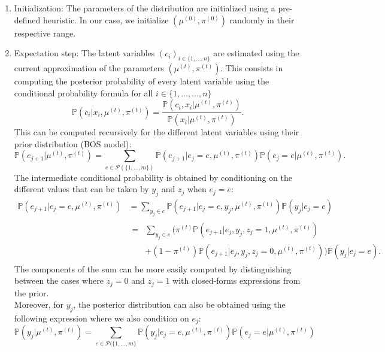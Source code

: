 \begin{enumerate}
    \item Initialization: The parameters of the distribution are initialized using a pre-defined heuristic. In our case, we initialize $(\mu^{(0)}, \pi^{(0)})$ randomly in their respective range.
    \item Expectation step: The latent variables $(c_i)_{i \in \{1, \ldots, n\}}$ are estimated using the current approximation of the parameters $(\mu^{(t)}, \pi^{(t)})$. This consists in computing the posterior probability of every latent variable using the conditional probability formula for all $i\in \{1, \ldots, ..., n\}$
    \begin{equation}
        \mathbb{P}(c_i | x_i, \mu^{(t)}, \pi^{(t)}) = \frac{\mathbb{P}(c_i, x_i| \mu^{(t)}, \pi^{(t)})}{\mathbb{P}(x_i| \mu^{(t)}, \pi^{(t)})}
    .\end{equation}
    This can be computed recursively for the different latent variables using their prior distribution (BOS model):
    \begin{equation}
        \mathbb{P}(e_{j+1}| \mu^{(t)}, \pi^{(t)}) = \sum_{e\in \mathcal{P}(\{1, \ldots, m\})} \mathbb{P}(e_{j+1}|e_j=e,  \mu^{(t)}, \pi^{(t)}) \mathbb{P}(e_j=e| \mu^{(t)}, \pi^{(t)})
    .\end{equation}
    The intermediate conditional probability is obtained by conditioning on the different values that can be taken by $y_j$ and $z_j$ when $e_j=e$:
    \begin{align}
    \mathbb{P}(e_{j+1}|e_j=e, \mu^{(t)}, \pi^{(t)}) &= \sum_{y_j \in e} \mathbb{P}(e_{j+1}|e_j=e, y_j, \mu^{(t)}, \pi^{(t)})\mathbb{P}(y_j|e_j=e) \\
    &\begin{aligned}
        = &\sum_{y_j \in e} (\pi^{(t)}\mathbb{P}(e_{j+1}|e_j, y_j, z_j=1, \mu^{(t)}, \pi^{(t)}) \\ 
        & + (1-\pi^{(t)})\mathbb{P}(e_{j+1}|e_j, y_j, z_j=0, \mu^{(t)}, \pi^{(t)}))\mathbb{P}(y_j|e_j=e)
    .\end{aligned}
    \end{align}
    The components of the sum can be more easily computed by distinguishing between the cases where $z_j=0$ and $z_j=1$ with closed-forms expressions from the prior. \\
    Moreover, for $y_j$, the posterior distribution can also be obtained using the following expression where we also condition on $e_j$:
    \begin{equation}
    \mathbb{P}(y_j| \mu^{(t)}, \pi^{(t)}) = \sum_{e\in \mathcal{P}(\{1, \ldots, m\}} \mathbb{P}(y_j|e_j=e, \mu^{(t)}, \pi^{(t)})\mathbb{P}(e_j=e| \mu^{(t)}, \pi^{(t)})

\end{equation}
\end{enumerate}
